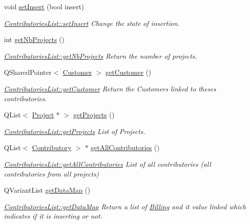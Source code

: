 \begin{DoxyCompactItemize}
void \hyperlink{classModels_1_1ContributoriesList_a5d34942a45954d98e53112e2523bee9b}{set\-Insert} (bool insert)
\begin{DoxyCompactList}\small\item\em \hyperlink{classModels_1_1ContributoriesList_a5d34942a45954d98e53112e2523bee9b}{Contributories\-List\-::set\-Insert} Change the state of insertion. \end{DoxyCompactList}\item 
int \hyperlink{classModels_1_1ContributoriesList_a026202989560ff9d462d6104b3788657}{get\-Nb\-Projects} ()
\begin{DoxyCompactList}\small\item\em \hyperlink{classModels_1_1ContributoriesList_a026202989560ff9d462d6104b3788657}{Contributories\-List\-::get\-Nb\-Projects} Return the number of projects. \end{DoxyCompactList}\item 
Q\-Shared\-Pointer$<$ \hyperlink{classModels_1_1Customer}{Customer} $>$ \hyperlink{classModels_1_1ContributoriesList_a760097b1c0d7822cfd3d4796d553fae9}{get\-Customer} ()
\begin{DoxyCompactList}\small\item\em \hyperlink{classModels_1_1ContributoriesList_a760097b1c0d7822cfd3d4796d553fae9}{Contributories\-List\-::get\-Customer} Return the Customers linked to theses contributories. \end{DoxyCompactList}\item 
Q\-List$<$ \hyperlink{classModels_1_1Project}{Project} $\ast$ $>$ \hyperlink{classModels_1_1ContributoriesList_a4d52a35870cd9257ee3b5db75bd8ff25}{get\-Projects} ()
\begin{DoxyCompactList}\small\item\em \hyperlink{classModels_1_1ContributoriesList_a4d52a35870cd9257ee3b5db75bd8ff25}{Contributories\-List\-::get\-Projects} List of Projects. \end{DoxyCompactList}\item 
Q\-List$<$ \hyperlink{classModels_1_1Contributory}{Contributory} $>$ $\ast$ \hyperlink{classModels_1_1ContributoriesList_a629a25a7958dba28ec37c8a3709cdf2f}{get\-All\-Contributories} ()
\begin{DoxyCompactList}\small\item\em \hyperlink{classModels_1_1ContributoriesList_a629a25a7958dba28ec37c8a3709cdf2f}{Contributories\-List\-::get\-All\-Contributories} List of all contributories (all contributories from all projects) \end{DoxyCompactList}\item 
Q\-Variant\-List \hyperlink{classModels_1_1ContributoriesList_af063322348b0f02d0c7159bd7413a836}{get\-Data\-Map} ()
\begin{DoxyCompactList}\small\item\em \hyperlink{classModels_1_1ContributoriesList_af063322348b0f02d0c7159bd7413a836}{Contributories\-List\-::get\-Data\-Map} Return a list of \hyperlink{classModels_1_1Billing}{Billing} and it value linked which indicates if it is inserting or not. \end{DoxyCompactList}\end{DoxyCompactItemize}


